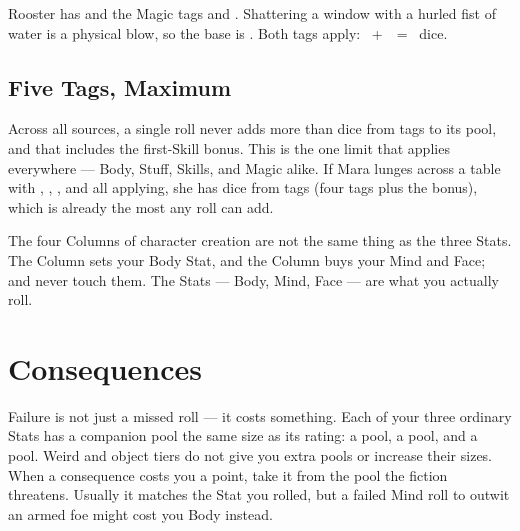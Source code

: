 \begin{example}
Rooster has   and the Magic tags
 and . Shattering a window
with a hurled fist of water is a physical blow, so the base is
. Both tags apply: ~+~~=~ dice.
\end{example}

\subsection*{Five Tags, Maximum}
Across all sources, a single roll never adds more than  dice
from tags to its pool, and that includes the first-Skill bonus. This is
the one limit that applies everywhere --- Body, Stuff, Skills, and Magic
alike. If Mara lunges across a table with ,
, , and
 all applying, she has  dice from tags
(four tags plus the bonus), which is already the most any roll can add.

\begin{notebox}
The four Columns of character creation are not the same thing as the three
Stats. The  Column sets your Body Stat, and the
 Column buys your Mind and Face;  and
 never touch them. The Stats --- Body, Mind, Face --- are
what you actually roll.
\end{notebox}

\section{Consequences}
Failure is not just a missed roll --- it costs something. Each of your
three ordinary Stats has a companion pool the same size as its rating:
a  pool, a  pool, and a  pool.
Weird and object tiers do not give you extra pools or increase their
sizes. When a consequence costs you a point, take it from the pool the
fiction threatens. Usually it matches the Stat you rolled, but a
failed Mind roll to outwit an armed foe might cost you Body instead.

